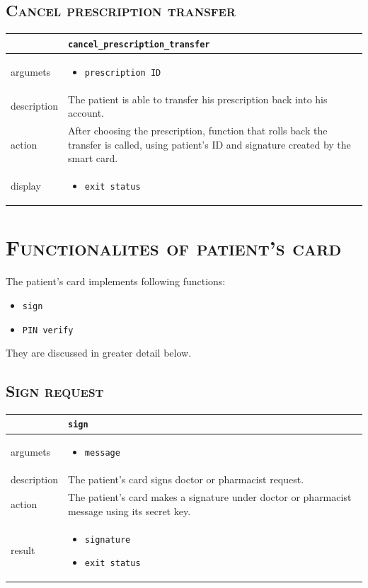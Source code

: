 \documentclass[12pt,titlepage]{article}
\begin{document}
\subsection{\textsc{Cancel prescription transfer}}

\begin{tabularx}{\textwidth}{ |p{2.5cm}|X| }
	\hline
	 &  \texttt{cancel\_prescription\_transfer}\\
\hline	
argumets & 
\begin{itemize}
\item \texttt{prescription ID}
\end{itemize} \\
\hline
description & The patient is able to transfer his prescription back into his account.\\
\hline
action & After choosing the prescription, function that rolls back the transfer is called, using patient's ID and signature created by the smart card.\\
\hline
display &
\begin{itemize}
\item \texttt{exit status}
\end{itemize}\\
\hline
\end{tabularx}


\newpage


\section{\textsc{Functionalites of patient's card}}

The patient's card implements following functions:
\begin{itemize}
\item \texttt{sign}
\item \texttt{PIN verify}
\end{itemize}
They are discussed in greater detail below.

\subsection{\textsc{Sign request}}

\begin{tabularx}{\textwidth}{ |p{2.5cm}|X| }
	\hline
	 &  \texttt{sign}\\
\hline	
argumets & 
\begin{itemize}
\item \texttt{message}
\end{itemize} \\
\hline
description & The patient's card signs doctor or pharmacist request.\\
\hline
action & 
The patient's card makes a signature under doctor or pharmacist message using its secret key.
\\
\hline
result &
\begin{itemize}
\item \texttt{signature}
\item \texttt{exit status}
\end{itemize}\\
\hline
\end{tabularx}
\end{document}
